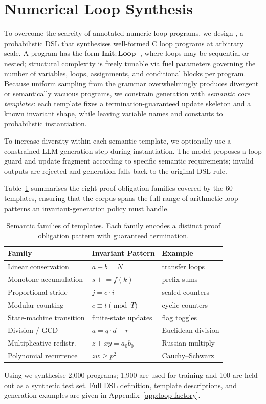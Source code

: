 \section{Numerical Loop Synthesis}\label{sec:loop-factory}

To overcome the scarcity of annotated numeric loop programs, we
design \lf{}, a probabilistic DSL that synthesises
well-formed C loop programs at arbitrary scale.
A program has the form $\textbf{Init}; \textbf{Loop}^+$, where loops
may be sequential or nested; structural complexity is freely tunable
via fuel parameters governing the number of variables, loops,
assignments, and conditional blocks per program.
Because uniform sampling from the grammar overwhelmingly produces
divergent or semantically vacuous programs, we constrain generation
with \emph{semantic core templates}: each template fixes a
termination-guaranteed update skeleton and a known invariant shape,
while leaving variable names and constants to probabilistic
instantiation.

To increase diversity within each semantic template, we optionally
use a constrained LLM generation step during instantiation.
The model proposes a loop guard and update fragment according to
specific semantic requirements; invalid outputs are rejected and
generation falls back to the original DSL rule.

Table~\ref{tab:semantic-families} summarises the eight proof-obligation
families covered by the 60 templates, ensuring that the corpus spans
the full range of arithmetic loop patterns an invariant-generation
policy must handle.

\begin{table}[t]
\caption{Semantic families of \lf{} templates. Each family encodes a
distinct proof obligation pattern with guaranteed termination.}
\label{tab:semantic-families}
\centering
\small
\begin{tabular}{@{}lll@{}}
\toprule
\textbf{Family} & \textbf{Invariant Pattern} & \textbf{Example} \\
\midrule
Linear conservation      & $a + b = N$                       & transfer loops \\
Monotone accumulation    & $s \mathrel{+}= f(k)$            & prefix sums \\
Proportional stride      & $j = c \cdot i$                   & scaled counters \\
Modular counting         & $c \equiv t \pmod{T}$             & cyclic counters \\
State-machine transition & finite-state updates              & flag toggles \\
Division / GCD           & $a = q \cdot d + r$               & Euclidean division \\
Multiplicative redistr.  & $z + xy = a_0 b_0$                & Russian multiply \\
Polynomial recurrence    & $zw \ge p^2$                      & Cauchy--Schwarz \\
\bottomrule
\end{tabular}
\end{table}

Using \lf{} we synthesise 2{,}000 programs; 1{,}900
are used for training and 100 are held out as a synthetic test set.
Full DSL definition, template descriptions, and generation examples
are given in Appendix~\ref{app:loop-factory}.
